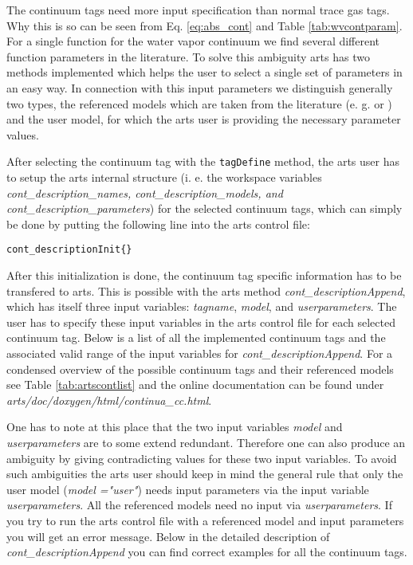 The continuum tags need more input specification than normal trace gas
tags. Why this is so can be seen from Eq. \ref{eq:abs_cont} and 
Table \ref{tab:wvcontparam}. For a single function for the water vapor 
continuum we find several different function parameters in the literature. 
To solve this ambiguity arts has two methods implemented which helps 
the user to select a single set of parameters in an easy way. 
In connection with this input parameters we distinguish generally two 
types, the referenced models which are taken from the literature 
(e. g. \citet{liebeetal:93} or \citet{pwr:93}) and the user model, 
for which the arts user is providing the necessary parameter values.

After selecting the continuum tag with the {\tt tagDefine} method, 
the arts user has to setup the arts internal structure (i. e. the workspace 
variables {\it cont\_description\_names, cont\_description\_models, 
and cont\_description\_parameters}) for the selected continuum tags, 
which can simply be done by putting the following line into the 
arts control file:
\begin{lstlisting}
cont_descriptionInit{}
\end{lstlisting}

After this initialization is done, the continuum tag specific
information has to be transfered to arts. This is possible with the 
arts method {\it cont\_descriptionAppend}, which has itself 
three input variables: {\it tagname}, {\it model}, and 
{\it userparameters}. The user has to specify these input 
variables in the arts control file for each selected continuum tag. 
Below is a list of all the implemented continuum tags and the associated
valid range of the input variables for {\it cont\_descriptionAppend}. 
For a condensed overview of the possible continuum tags and their 
referenced models see Table \ref{tab:artscontlist} and the 
online documentation can be found under {\it arts/doc/doxygen/html/continua\_cc.html}.

One has to note at this place that the two input variables {\it model} and
{\it userparameters} are to some extend redundant. Therefore one can also 
produce an ambiguity by giving contradicting values for these two input variables.
To avoid such ambiguities the arts user should keep in mind the general 
rule that only the user model ({\it model ="user"}) needs input parameters 
via the input variable {\it userparameters}. All the referenced models 
need no input via {\it userparameters}. If you try to run the arts control 
file with a referenced model and input parameters you will get an error message.
Below in the detailed description of {\it cont\_descriptionAppend} you 
can find correct examples for all the continuum tags.
 
